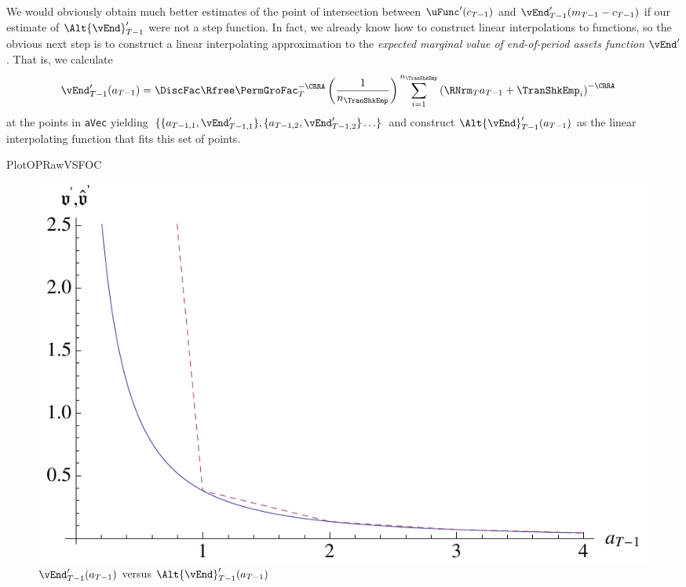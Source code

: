 \documentclass[titlepage, headings=optiontotocandhead]{\econtex}
\begin{document}
We would obviously obtain much better estimates of the point of
intersection between $\uFunc^{\prime}({c}_{T-1})$ and
$\vEnd_{T-1}^{\prime}({m}_{T-1}-{c}_{T-1})$ if our estimate of
$\Alt{\vEnd}^{\prime}_{T-1}$ were not a step function.  In
fact, we already know how to construct linear interpolations
to functions, so the obvious next step is to construct a
linear interpolating approximation to the \textit{expected marginal
  value of end-of-period assets function} $\vEnd^{\prime}$. That is, we calculate
\begin{equation}\begin{gathered}\begin{aligned}
      \vEnd_{T-1}^{\prime}({a}_{T-1})  & =  \DiscFac \Rfree \PermGroFac_{T}^{-\CRRA} \left(\frac{1}{n_{\TranShkEmp}}\right) \sum_{i=1}^{n_{\TranShkEmp}} \left(\RNrm_{T} {a}_{T-1} + \TranShkEmp_{i}\right)^{-\CRRA} \label{eq:vEndPrimeTm1}
    \end{aligned}\end{gathered}\end{equation}
at the points in \texttt{aVec} yielding
$\{\{\null{a}_{T-1,1},\vEnd_{T-1,1}^{\prime}\},\{{a}_{T-1,2},\vEnd_{T-1,2}^{\prime}\}
\ldots\}$ and construct
$\Alt{\vEnd}_{T-1}^{\prime}({a}_{T-1})$ as the linear
interpolating function that fits this set of points.

\hypertarget{}{PlotOPRawVSFOC}{}
\begin{figure}
  \includegraphics{./Figures/PlotOPRawVSFOC}
  \caption{$\vEnd_{T-1}^{\prime}({a}_{T-1})$ versus $\Alt{\vEnd}_{T-1}^{\prime}({a}_{T-1})$}
  \label{fig:PlotOPRawVSFOC}
\end{figure}
\end{document}
